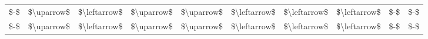 \begin{tabular}{llllllllll}
         \$-\$ & \$\textbackslash uparrow\$ & \$\textbackslash leftarrow\$ & \$\textbackslash uparrow\$ & \$\textbackslash uparrow\$ & \$\textbackslash leftarrow\$ & \$\textbackslash leftarrow\$ & \$\textbackslash leftarrow\$ &          \$-\$ &          \$-\$ \\
         \$-\$ & \$\textbackslash uparrow\$ & \$\textbackslash leftarrow\$ & \$\textbackslash uparrow\$ & \$\textbackslash uparrow\$ & \$\textbackslash leftarrow\$ & \$\textbackslash leftarrow\$ & \$\textbackslash leftarrow\$ &          \$-\$ &          \$-\$ \\
\bottomrule
\end{tabular}
